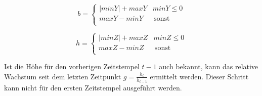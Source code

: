 \documentclass[12pt,titlepage, twoside]{article}
\begin{document}
\begin{equation}
    \label{eq:width}
    b = \left\{
    \begin{array}{ll}
    |minY| + maxY & minY \leq 0 \\
    maxY - minY & \, \textrm{sonst} \\
    \end{array}
    \right. 
\end{equation}

\begin{equation}
    \label{eq:height}
    h = \left\{
    \begin{array}{ll}
    |minZ| + maxZ & minZ \leq 0 \\
    maxZ - minZ & \, \textrm{sonst} \\
    \end{array}
    \right. 
\end{equation}

Ist die Höhe für den vorherigen Zeitstempel $t-1$ auch bekannt, kann das relative Wachstum seit dem letzten Zeitpunkt $g=\frac{h_t}{h_{t-1}}$ ermittelt werden. Dieser Schritt kann nicht für den ersten Zeitstempel ausgeführt werden.
\end{document}
